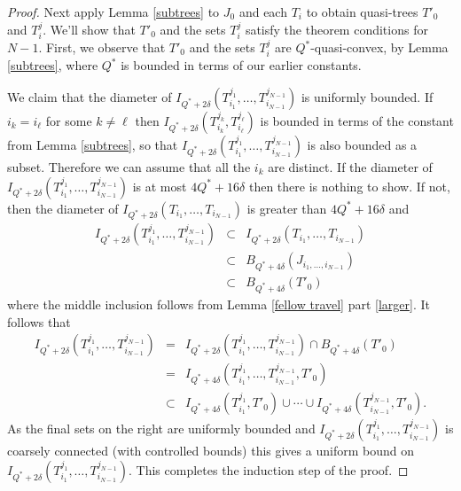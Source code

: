 \documentclass[10pt,a4paper]{amsart}
\begin{document}
\begin{proof}
Next apply Lemma \ref{subtrees} to $J_0$ and each $T_i$ to obtain quasi-trees $T'_0$ and $T^j_i$. 
We'll show that $T'_0$ and the sets $T^j_i$ satisfy the theorem conditions for $N-1$. First, we observe that $T'_0$ and the sets $T^j_i$ are $Q^*$-quasi-convex, by Lemma \ref{subtrees}, where $Q^*$ is bounded in terms of our earlier constants.
 
 We claim that the diameter of $I_{Q^*+2\delta}(T^{j_1}_{i_1}, \dots, T^{j_{N-1}}_{i_{N-1}})$ is uniformly bounded. If $i_k = i_\ell$ for some $k \neq \ell$ then $I_{Q^*+2\delta}(T_{i_k}^{j_k}, T_{i_\ell}^{j_\ell})$ is bounded in terms of the constant from Lemma \ref{subtrees}, so that $I_{Q^*+2\delta}(T^{j_1}_{i_1}, \dots, T^{j_{N-1}}_{i_{N-1}})$ is also bounded as a subset. Therefore we can assume that all the $i_k$ are distinct. If the
 diameter of $I_{Q^*+2\delta}(T^{j_1}_{i_1}, \dots, T^{j_{N-1}}_{i_{N-1}})$ is at most $4Q^* + 16\delta$ then there is nothing to show. If not, then the diameter of $I_{Q^*+2\delta}(T_{i_1}, \dots, T_{i_{N-1}})$ is greater than $4Q^* + 16\delta$ and
\begin{eqnarray*}
I_{Q^*+2\delta}\left(T^{j_1}_{i_1}, \dots, T^{j_{N-1}}_{i_{N-1}}\right) &\subset & I_{Q^*+2\delta}(T_{i_1}, \dots, T_{i_{N-1}}) \\
& \subset & B_{Q^* + 4\delta}(J_{i_1, \dots, i_{N-1}}) \\ %
& \subset & B_{Q^*+4\delta}(T'_0)
\end{eqnarray*}
where the middle inclusion follows from Lemma \ref{fellow travel} part \eqref{larger}.
It follows that
\begin{eqnarray*}
I_{Q^*+2\delta}\left(T^{j_1}_{i_1}, \dots, T^{j_{N-1}}_{i_{N-1}}\right)& = &I_{Q^*+2\delta}\left(T^{j_1}_{i_1}, \dots, T^{j_{N-1}}_{i_{N-1}}\right) \cap B_{Q^*+4\delta}(T'_0)\\ & = & I_{Q^*+4\delta}\left(T^{j_1}_{i_1}, \dots, T^{j_{N-1}}_{i_{N-1}}, T'_0\right) \\
&\subset& I_{Q^*+4\delta}\left(T^{j_1}_{i_1}, T'_0\right) \cup \cdots \cup I_{Q^*+4\delta}\left(T^{j_{N-1}}_{i_{N-1}}, T'_0\right).
\end{eqnarray*}
As the final sets on the right are uniformly bounded and $I_{Q^*+2\delta}(T^{j_1}_{i_1}, \dots, T^{j_{N-1}}_{i_{N-1}})$ is coarsely connected (with controlled bounds) this gives a uniform bound on $I_{Q^*+2\delta}(T^{j_1}_{i_1}, \dots, T^{j_{N-1}}_{i_{N-1}})$. This completes the induction step of the proof.
\end{proof}
\end{document}
